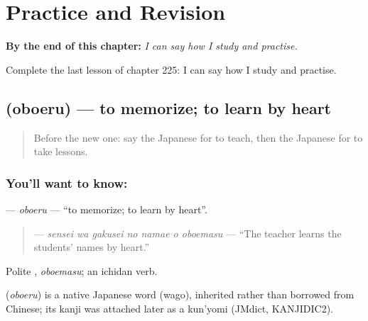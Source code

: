
\chapter{Practice and Revision}
\label{ch:ja-practice-and-revision}

\begin{chapteropening}
\textbf{By the end of this chapter:} \emph{I can say how I study and practise.}

Complete the last lesson of chapter 225: I can say how I study and practise.
\end{chapteropening}

\section[\texorpdfstring{\ja{おぼえる} (oboeru)}{おぼえる (oboeru)}]{ (oboeru) — to memorize; to learn by heart}

\label{lesson:JA-C225-oboeru}



\begin{quote}
Before the new one: say the Japanese for to teach, then the Japanese for to take lessons.
\end{quote}

\subsection*{You'll want to know: }
\textbf{} — \emph{oboeru} — \textquotedblleft{}to memorize; to learn by heart\textquotedblright{}.

\begin{quote}
\textbf{   } — \emph{sensei wa gakusei no namae o oboemasu} — \textquotedblleft{}The teacher learns the students' names by heart.\textquotedblright{}
\end{quote}

Polite \textbf{}, \emph{oboemasu}; an ichidan verb.

\begin{cousinweb}
\textbf{} (\emph{oboeru}) is a native Japanese word (wago), inherited rather than borrowed from Chinese; its kanji was attached later as a kun'yomi (JMdict, KANJIDIC2).
\end{cousinweb}

